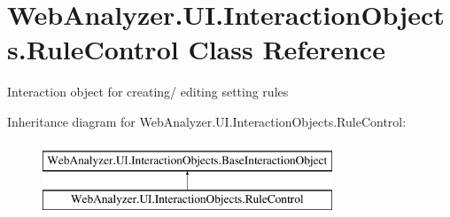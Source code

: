 \hypertarget{class_web_analyzer_1_1_u_i_1_1_interaction_objects_1_1_rule_control}{}\section{Web\+Analyzer.\+U\+I.\+Interaction\+Objects.\+Rule\+Control Class Reference}
\label{class_web_analyzer_1_1_u_i_1_1_interaction_objects_1_1_rule_control}


Interaction object for creating/ editing setting rules  


Inheritance diagram for Web\+Analyzer.\+U\+I.\+Interaction\+Objects.\+Rule\+Control\+:\begin{figure}[H]
\begin{center}
\leavevmode
\includegraphics[height=2.000000cm]{class_web_analyzer_1_1_u_i_1_1_interaction_objects_1_1_rule_control}
\end{center}
\end{figure}
